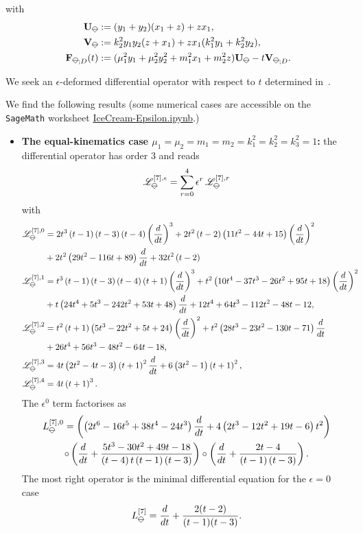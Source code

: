 \documentclass[a4paper,12pt]{article}
\numberwithin{equation}{section}
\numberwithin{figure}{section}
\newcommand{\IceCream}{	\begin{tikzpicture}[scale=0.05]
	\draw[color = black, fill=none] (2,0) arc(0:180:2);
		\draw [black] (-2,0) to (2,0);
		\draw [black] (-2,0) to (0,-2);
                	\draw [black] (2,0) to (0,-2);
	\end{tikzpicture}}
\begin{document}
with
\begin{align}
	\textbf{U}_{\IceCream}&:=(y_1+y_2)(x_1+z)+zx_1,\cr
	\textbf{V}_{\IceCream}&:=k_2^2y_1y_2(z+x_1)+zx_1(k_1^2y_1+k_2^2y_2),\\
	\nonumber  \textbf{F}_{\IceCream;D}(t)&:=
	(\mu_1^2y_1+\mu_2^2y_2^2+m_1^2x_1+m_2^2z) \textbf{U}_{\IceCream}-t \textbf{V}_{\IceCream;D}.
\end{align}

We seek an $\epsilon$-deformed differential
operator with respect to $t$ determined in~\cite{Lairez:2022zkj,Doran:2023yzu}.

We find the following results (some numerical cases are accessible on
the {\tt
  SageMath} worksheet \href{IceCream-Epsilon.ipynb}{IceCream-Epsilon.ipynb}.)
\begin{itemize}
	\item {\bf The equal-kinematics case
		$\mu_1=\mu_2=m_1=m_2=k_1^2=k_2^2=k_3^2=1$:} the differential operator
	has order 3 and
	reads
	\begin{equation}
		\mathscr{L}_{\IceCream}^{[7],\epsilon}=\sum_{r=0}^4 \epsilon^r\,\mathscr{L}_{\IceCream}^{[7],r}
	\end{equation}
	with
	\begin{align}
		\mathscr{L}_{\IceCream}^{[7],0}&= 2 t^{3} \left(t -1\right)
		\left(t -3\right) \left(t -4\right) \left(d\over dt\right)^{3}+2 t^{2} \left(t
		-2\right) \left(11 t^{2}-44 t +15\right) \left(d\over dt\right)^{2}\cr&+2 t^{2}
		\left(29 t^{2}-116 t +89\right) {d\over dt} +32 t^{2} \left(t
		-2\right)\cr
		\mathscr{L}_{\IceCream}^{[7],1}&=t^{3} \left(t -1\right) \left(t -3\right) \left(t -4\right) \left(t +1\right) \left(d\over dt\right)^{3}+t^{2} \left(10 t^{4}-37 t^{3}-26 t^{2}+95 t +18\right) \left(d\over dt\right)^{2}\cr&+t \left(24 t^{4}+5 t^{3}-242 t^{2}+53 t +48\right)  {d\over dt} +12 t^{4}+64 t^{3}-112 t^{2}-48 t -12,\cr
		\mathscr{L}_{\IceCream}^{[7],2}&=t^{2} \left(t +1\right) \left(5 t^{3}-22 t^{2}+5 t +24\right) \left(d\over dt\right)^{2}+t^{2} \left(28 t^{3}-23 t^{2}-130 t -71\right)  {d\over dt} \cr&+26 t^{4}+56 t^{3}-48 t^{2}-64 t -18,\cr
		\mathscr{L}_{\IceCream}^{[7],3}&=4 t \left(2 t^{2}-4 t -3\right) \left(t +1\right)^{2}
		{d\over dt}+6 \left(3 t^{2}-1\right) \left(t +1\right)^{2},\cr
		\mathscr{L}_{\IceCream}^{[7],4}&= 4 t \left(t +1\right)^{3}.
	\end{align}
	The $\epsilon^0$ term factorises as
	\begin{multline}
		L_{\IceCream}^{[7],0}=\left(
		\left(2 t^{6}-16 t^{5}+38 t^{4}-24 t^{3}\right) {{d\over dt}} +4 \left(2 t^{3}-12 t^{2}+19 t -6\right) t^{2}\right)\cr\circ
		\left(
		{{d\over dt}} +\frac{5 t^{3}-30 t^{2}+49 t -18}{\left(t -4\right) t \left(t -1\right) \left(t -3\right)}
		\right)\circ \left({{d\over dt}} +\frac{2 t -4}{\left(t -1\right) \left(t -3\right)}
		\right).
	\end{multline}
	The most right operator is the minimal differential equation for the
	$\epsilon=0$ case~\cite{Lairez:2022zkj}
	\begin{equation}
		L_{\IceCream}^{[7]}= {d\over dt}+ {2(t - 2)\over (t - 1)(t - 3)  }.
	\end{equation}
	

\end{itemize}
\end{document}
